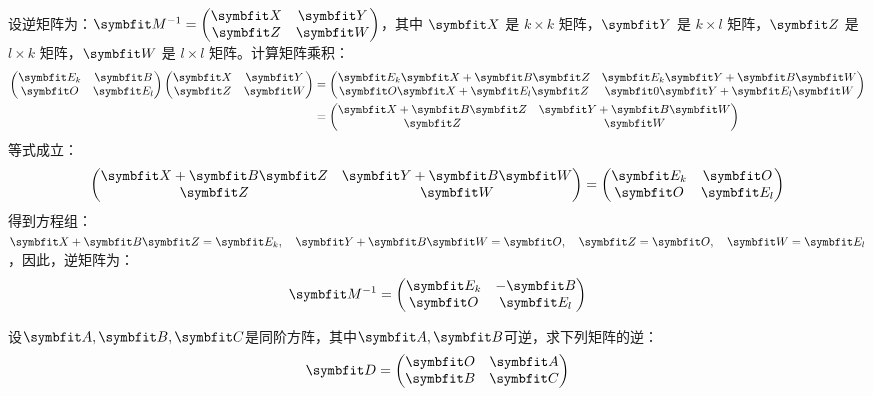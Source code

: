\begin{solution}
设逆矩阵为：$\bv{M}^{-1} = \begin{pmatrix} \bv{X} & \bv{Y} \\ \bv{Z} & \bv{W} \end{pmatrix}$，其中 $\bv{X}$ 是 $k \times k$ 矩阵，$\bv{Y}$ 是 $k \times l$ 矩阵，$\bv{Z}$ 是 $l \times k$ 矩阵，$\bv{W}$ 是 $l \times l$ 矩阵。计算矩阵乘积：
\begin{align*}
\begin{pmatrix} \bv{E}_k & \bv{B} \\ \bv{O} & \bv{E}_l \end{pmatrix}
\begin{pmatrix} \bv{X} & \bv{Y} \\ \bv{Z} & \bv{W} \end{pmatrix} 
&= \begin{pmatrix}
    \bv{E}_k\bv{X} + \bv{B}\bv{Z} & \bv{E}_k\bv{Y} + \bv{B}\bv{W} \\
    \bv{O}\bv{X} + \bv{E}_l\bv{Z} & \bv{0}\bv{Y} + \bv{E}_l\bv{W}
\end{pmatrix} \\
&= \begin{pmatrix}
    \bv{X} + \bv{B}\bv{Z} & \bv{Y} + \bv{B}\bv{W} \\
    \bv{Z} & \bv{W}
\end{pmatrix}
\end{align*}
等式成立：
\[
\begin{pmatrix}
    \bv{X} + \bv{B}\bv{Z} & \bv{Y} + \bv{B}\bv{W} \\
    \bv{Z} & \bv{W}
\end{pmatrix} = 
\begin{pmatrix} \bv{E}_k & \bv{O} \\ \bv{O} & \bv{E}_l \end{pmatrix}
\]
得到方程组：
$\bv{X} + \bv{B}\bv{Z} = \bv{E}_k,\quad\bv{Y} + \bv{B}\bv{W} = \bv{O},\quad\bv{Z} = \bv{O},\quad\bv{W} = \bv{E}_l$，因此，逆矩阵为：
\[\bv{M}^{-1} = \begin{pmatrix} \bv{E}_k & -\bv{B} \\ \bv{O} & \bv{E}_l \end{pmatrix}\]
\end{solution}
\begin{example}{}{}
    设$\bv{A},\bv{B},\bv{C}$是同阶方阵，其中$\bv{A},\bv{B}$可逆，求下列矩阵的逆：\[\bv{D}=\begin{pmatrix}\bv{O}&\bv{A}\\\bv{B}&\bv{C}\end{pmatrix}\]
\end{example}
